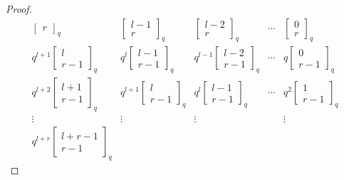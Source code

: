 \documentclass[12pt]{amsart}
\theoremstyle{definition}
\theoremstyle{remark}
\numberwithin{equation}{section}
\numberwithin{figure}{section}
\begin{document}
\begin{proof}
\[\begin{array}{ccccc}
\begin{bmatrix}
    r
    \end{bmatrix}_q
    &
    \begin{bmatrix}
    l-1\\
    r
    \end{bmatrix}_q
    &
    \begin{bmatrix}
    l-2\\
    r
    \end{bmatrix}_q
    &
    \cdots 
    &
    \begin{bmatrix}
    0\\
    r
    \end{bmatrix}_q
    \\
    q^{l+1}\begin{bmatrix}
    l\\
    r-1
    \end{bmatrix}_q
    &
    q^{l}\begin{bmatrix}
    l-1\\
    r-1
    \end{bmatrix}_q
    &
    q^{l-1}\begin{bmatrix}
    l-2\\
    r-1
    \end{bmatrix}_q
    &
    \cdots 
    &
    q\begin{bmatrix}
    0\\
    r-1
    \end{bmatrix}_q
    \\
    q^{l+2}\begin{bmatrix}
    l+1\\
    r-1
    \end{bmatrix}_q
    &
    q^{l+1}\begin{bmatrix}
    l\\
    r-1
    \end{bmatrix}_q
    &
    q^l\begin{bmatrix}
    l-1\\
    r-1
    \end{bmatrix}_q
    &
    \cdots 
    &
    q^2\begin{bmatrix}
    1\\
    r-1
    \end{bmatrix}_q
    \\
    \vdots&\vdots&\vdots& &\vdots\\
    q^{l+r}\begin{bmatrix}
    l+r-1 \\
    r -1
    \end{bmatrix}_q

\end{array}\]
\end{proof}
\end{document}
